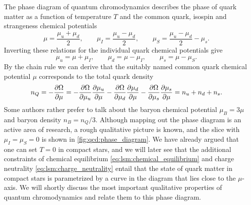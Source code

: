 The phase diagram of quantum chromodynamics describes the phase of quark matter
as a function of temperature $T$ and the common quark, isospin and strangeness chemical potentials
\begin{equation}
	\mu   = \frac{\mu_u + \mu_d}{2}, \qquad
	\mu_I = \frac{\mu_u - \mu_d}{2}, \qquad
	\mu_S = \frac{\mu_u - \mu_d}{2} - \mu_s.
\label{eq:master_intro:chemical_potentials_transformed}
\end{equation}
Inverting these relations for the individual quark chemical potentials give
\begin{equation}
	\mu_u = \mu + \mu_I, \qquad
	\mu_d = \mu - \mu_I, \qquad
	\mu_s = \mu - \mu_S .
\label{eq:master_intro:chemical_potentials_particles}
\end{equation}
By the chain rule we can derive that the suitably named common quark chemical potential $\mu$ corresponds to the total quark density
\begin{equation}
	n_Q = -\pdv{\Omega}{\mu} =
	-\pdv{\Omega}{\mu_u} \pdv{\mu_u}{\mu}
	-\pdv{\Omega}{\mu_d} \pdv{\mu_d}{\mu}
	-\pdv{\Omega}{\mu_s} \pdv{\mu_s}{\mu} =
	n_u + n_d + n_s.
\end{equation}
Some authors rather prefer to talk about the baryon chemical potential $\mu_B = 3 \mu$ and baryon density $n_B = n_Q / 3$.
Although mapping out the phase diagram is an active area of research, a rough qualitative picture is known, and the slice with $\mu_I = \mu_S = 0$ is shown in \cref{fig:qcd:phase_diagram}.
We have already argued that one can set $T=0$ in compact stars,
and we will later see that the additional constraints of chemical equilibrium \eqref{eq:lsm:chemical_equilibrium} and charge neutrality \eqref{eq:lsm:charge_neutrality} entail that
the state of quark matter in compact stars is parametrized by a curve in the diagram that lies close to the $\mu$-axis.
We will shortly discuss the most important qualitative properties of quantum chromodynamics and relate them to this phase diagram.

